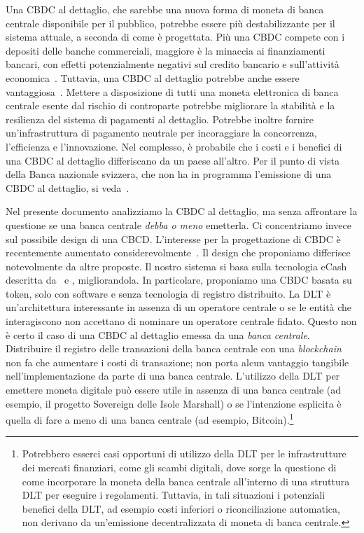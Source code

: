 \documentclass[a4paper]{article}
\begin{document}
Una CBDC al dettaglio, che sarebbe una nuova forma di moneta di banca
centrale disponibile per il pubblico, potrebbe essere più destabilizzante
per il sistema attuale, a seconda di come è progettata. Più una CBDC
compete con i depositi delle banche commerciali, maggiore è la minaccia
ai finanziamenti bancari, con effetti potenzialmente negativi sul credito
bancario e sull'attività economica~\cite[vedi][]{Agur}. Tuttavia, una
CBDC al dettaglio potrebbe anche essere
vantaggiosa~\cite[vedi][]{Bordo,Berentsen,Bindseil,Niepelt,Riksbank,BoE}.
Mettere a disposizione di tutti una moneta elettronica di banca centrale
esente dal rischio di controparte potrebbe migliorare la stabilità e la
resilienza del sistema di pagamenti al dettaglio. Potrebbe inoltre fornire
un'infrastruttura di pagamento neutrale per incoraggiare la concorrenza,
l'efficienza e l'innovazione. Nel complesso, è probabile che i costi e i
benefici di una CBDC al dettaglio differiscano da un paese all'altro. Per
il punto di vista della Banca nazionale svizzera, che non ha in programma
l'emissione di una CBDC al dettaglio, si veda~\cite{Jordan}.

Nel presente documento analizziamo la CBDC al dettaglio, ma senza
affrontare la questione se una banca centrale \emph{debba o meno} emetterla.
Ci concentriamo invece sul possibile design di una CBCD. L'interesse
per la progettazione di CBDC è recentemente aumentato
considerevolmente~\cite[si veda, ad esempio,][]{Allen,BoE}. Il design che
proponiamo differisce notevolmente da altre proposte. Il nostro sistema
si basa sulla tecnologia eCash descritta da~\cite{Chaum1983} e \cite{Chaum1990},
migliorandola. In particolare, proponiamo una CBDC basata su token, solo
con software e senza tecnologia di registro distribuito. La DLT è
un'architettura interessante in assenza di un operatore centrale o se le
entità che interagiscono non accettano di nominare un operatore centrale
fidato. Questo non è certo il caso di una CBDC al dettaglio emessa da una
\emph{banca centrale}. Distribuire il registro delle transazioni della
banca centrale con una \textit{blockchain} non fa che aumentare i costi
di transazione; non porta alcun vantaggio tangibile nell'implementazione
da parte di una banca centrale. L'utilizzo della DLT per emettere moneta
digitale può essere utile in assenza di una banca centrale (ad esempio,
il progetto Sovereign delle Isole Marshall) o se l'intenzione esplicita
è quella di fare a meno di una banca centrale (ad esempio,
Bitcoin).\footnote{Potrebbero esserci casi opportuni di utilizzo della
DLT per le infrastrutture dei mercati finanziari, come gli scambi digitali,
dove sorge la questione di come incorporare la moneta della banca centrale
all'interno di una struttura DLT per eseguire i regolamenti. Tuttavia,
in tali situazioni i potenziali benefici della DLT, ad esempio costi
inferiori o riconciliazione automatica, non derivano da un'emissione
decentralizzata di moneta di banca centrale.}
\end{document}
